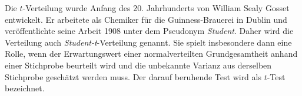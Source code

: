 



Die $t$-Verteilung wurde Anfang des 20. Jahrhunderts von William Sealy Gosset
entwickelt. Er \mbox{arbeitete} als Chemiker für die Guinness-Brauerei in Dublin
und veröffentlichte seine Arbeit 1908 unter dem Pseudonym \textsl{Student}.
Daher wird die Verteilung auch \textsl{Student-t}-Verteilung genannt.
Sie spielt insbesondere dann eine Rolle, wenn der Erwartungswert einer
normalverteilten Grundgesamtheit anhand einer Stichprobe beurteilt wird
und die unbekannte Varianz aus derselben Stichprobe geschätzt werden muss.
Der darauf beruhende Test wird als $t$-Test bezeichnet.

